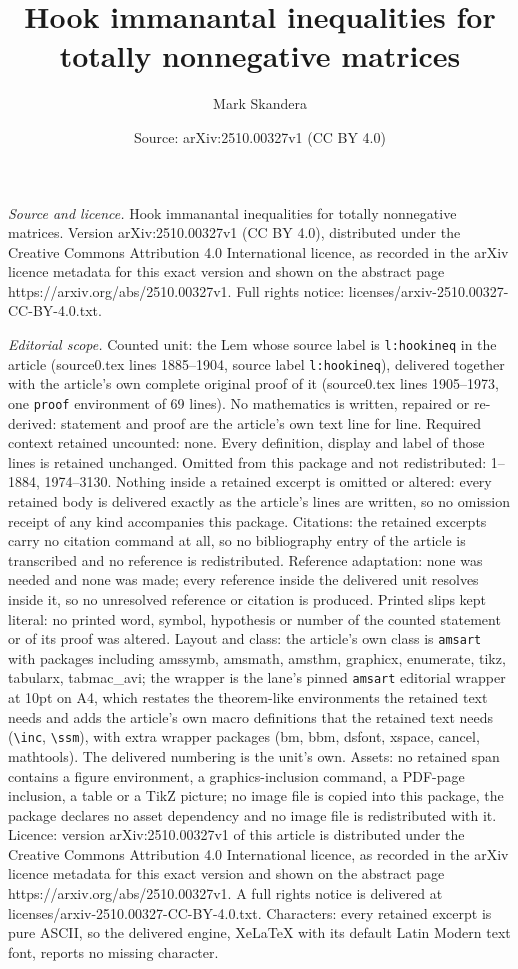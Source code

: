 \documentclass[10pt,a4paper]{amsart}
\title[Hook immanantal inequalities for totally nonnegative matrice]{Hook immanantal inequalities for totally nonnegative matrices}
\author{Mark Skandera}
\date{Source: arXiv:2510.00327v1 (CC BY 4.0)}
\begin{document}
\maketitle

\noindent\emph{Source and licence.} Hook immanantal inequalities for totally nonnegative matrices. Version arXiv:2510.00327v1 (CC BY 4.0), distributed under the Creative Commons Attribution 4.0 International licence, as recorded in the arXiv licence metadata for this exact version and shown on the abstract page https://arxiv.org/abs/2510.00327v1. Full rights notice: licenses/arxiv-2510.00327-CC-BY-4.0.txt.\par\smallskip

\noindent\textit{Editorial scope.} Counted unit: the Lem whose source label is \texttt{l:hookineq} in the article (source0.tex lines 1885--1904, source label \texttt{l:hookineq}), delivered together with the article's own complete original proof of it (source0.tex lines 1905--1973, one \texttt{proof} environment of 69 lines). No mathematics is written, repaired or re-derived: statement and proof are the article's own text line for line. Required context retained uncounted: none. Every definition, display and label of those lines is retained unchanged. Omitted from this package and not redistributed: 1--1884, 1974--3130. Nothing inside a retained excerpt is omitted or altered: every retained body is delivered exactly as the article's lines are written, so no omission receipt of any kind accompanies this package. Citations: the retained excerpts carry no citation command at all, so no bibliography entry of the article is transcribed and no reference is redistributed. Reference adaptation: none was needed and none was made; every reference inside the delivered unit resolves inside it, so no unresolved reference or citation is produced. Printed slips kept literal: no printed word, symbol, hypothesis or number of the counted statement or of its proof was altered. Layout and class: the article's own class is \texttt{amsart} with packages including amssymb, amsmath, amsthm, graphicx, enumerate, tikz, tabularx, tabmac\_avi; the wrapper is the lane's pinned \texttt{amsart} editorial wrapper at 10pt on A4, which restates the theorem-like environments the retained text needs and adds the article's own macro definitions that the retained text needs (\texttt{\textbackslash inc}, \texttt{\textbackslash ssm}), with extra wrapper packages (bm, bbm, dsfont, xspace, cancel, mathtools). The delivered numbering is the unit's own. Assets: no retained span contains a figure environment, a graphics-inclusion command, a PDF-page inclusion, a table or a TikZ picture; no image file is copied into this package, the package declares no asset dependency and no image file is redistributed with it. Licence: version arXiv:2510.00327v1 of this article is distributed under the Creative Commons Attribution 4.0 International licence, as recorded in the arXiv licence metadata for this exact version and shown on the abstract page https://arxiv.org/abs/2510.00327v1. A full rights notice is delivered at licenses/arxiv-2510.00327-CC-BY-4.0.txt. Characters: every retained excerpt is pure ASCII, so the delivered engine, XeLaTeX with its default Latin Modern text font, reports no missing character.
\end{document}
